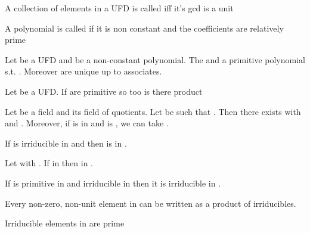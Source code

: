 \begin{Le}
\begin{D} A collection of elements in a UFD is called  iff it's gcd is a unit \end{D}

\begin{D} A polynomial  is called  if it is non constant and the coefficients are relatively prime \end{D}

\begin{Le} Let  be a UFD and  be a non-constant polynomial. The   and a primitive polynomial  s.t. . Moreover  are unique up to associates. \end{Le}

\begin{Le} Let  be a UFD. If  are primitive so too is there product  \end{Le}

\begin{Le} Let  be a field and  its field of quotients. Let  be such that .  Then there exists  with  and . Moreover, if  is in  and is , we can take . \end{Le}

\begin{Le} If  is irriducible in  and  then  is  in . \end{Le}

\begin{Le} Let  with . If  in  then  in . \end{Le}

\begin{Le} If  is primitive in  and irriducible in  then it is irriducible in . \end{Le}

\begin{P} Every non-zero, non-unit element in  can be written as a product of irriducibles. \end{P}

\begin{P} Irriducible elements in  are prime \end{P}


\end{Le}
